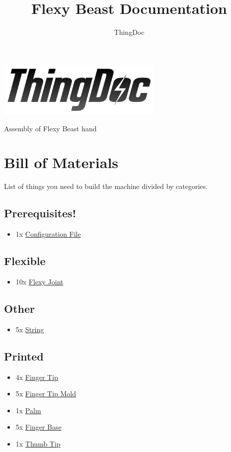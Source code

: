 \documentclass[11pt]{article}
\title{Flexy Beast Documentation}
\author{ThingDoc}
\begin{document}
\maketitle
\begin{center}
\includegraphics[width=8cm]{logo.png}
\end{center}
Assembly of Flexy Beast hand

\newpage

\tableofcontents

\newpage

\section{Bill of Materials}
List of things you need to build the machine divided by categories.

\subsection{Prerequisites!}
\begin{itemize}
\item 1x \hyperlink{thing_config\_file}{Configuration File}
\end{itemize}

\subsection{Flexible}
\begin{itemize}
\item 10x \hyperlink{thing_flexy\_joint}{Flexy Joint}
\end{itemize}

\subsection{Other}
\begin{itemize}
\item 5x \hyperlink{thing_string}{String}
\end{itemize}

\subsection{Printed}
\begin{itemize}
\item 4x \hyperlink{thing_finger\_tip}{Finger Tip}
\item 5x \hyperlink{thing_finger\_tip\_mold}{Finger Tip Mold}
\item 1x \hyperlink{thing_palm}{Palm}
\item 5x \hyperlink{thing_finger\_base}{Finger Base}
\item 1x \hyperlink{thing_thumb\_tip}{Thumb Tip}
\end{itemize}
\end{document}
